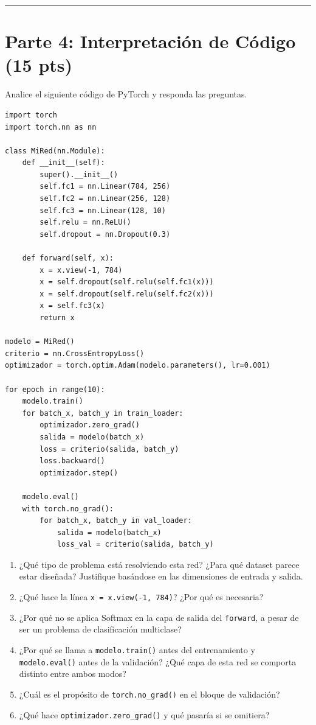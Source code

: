 \documentclass[12pt,a4paper]{article}
\begin{document}
\vspace{0.5cm}
\hrule
\vspace{0.5cm}

\section*{Parte 4: Interpretación de Código (15 pts)}

Analice el siguiente código de PyTorch y responda las preguntas.

\begin{lstlisting}
import torch
import torch.nn as nn

class MiRed(nn.Module):
    def __init__(self):
        super().__init__()
        self.fc1 = nn.Linear(784, 256)
        self.fc2 = nn.Linear(256, 128)
        self.fc3 = nn.Linear(128, 10)
        self.relu = nn.ReLU()
        self.dropout = nn.Dropout(0.3)

    def forward(self, x):
        x = x.view(-1, 784)
        x = self.dropout(self.relu(self.fc1(x)))
        x = self.dropout(self.relu(self.fc2(x)))
        x = self.fc3(x)
        return x

modelo = MiRed()
criterio = nn.CrossEntropyLoss()
optimizador = torch.optim.Adam(modelo.parameters(), lr=0.001)

for epoch in range(10):
    modelo.train()
    for batch_x, batch_y in train_loader:
        optimizador.zero_grad()
        salida = modelo(batch_x)
        loss = criterio(salida, batch_y)
        loss.backward()
        optimizador.step()

    modelo.eval()
    with torch.no_grad():
        for batch_x, batch_y in val_loader:
            salida = modelo(batch_x)
            loss_val = criterio(salida, batch_y)
\end{lstlisting}

\begin{enumerate}[label=\alph*)]
    \item ¿Qué tipo de problema está resolviendo esta red? ¿Para qué dataset parece estar diseñada? Justifique basándose en las dimensiones de entrada y salida.

    \item ¿Qué hace la línea \texttt{x = x.view(-1, 784)}? ¿Por qué es necesaria?

    \item ¿Por qué no se aplica Softmax en la capa de salida del \texttt{forward}, a pesar de ser un problema de clasificación multiclase?

    \item ¿Por qué se llama a \texttt{modelo.train()} antes del entrenamiento y \texttt{modelo.eval()} antes de la validación? ¿Qué capa de esta red se comporta distinto entre ambos modos?

    \item ¿Cuál es el propósito de \texttt{torch.no\_grad()} en el bloque de validación?

    \item ¿Qué hace \texttt{optimizador.zero\_grad()} y qué pasaría si se omitiera?
\end{enumerate}
\end{document}
